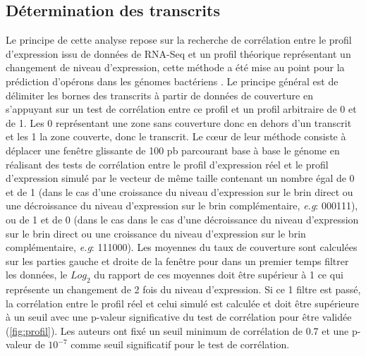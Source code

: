 \documentclass[12pt,a4paper]{report}
\begin{document}
\begin{onehalfspace}
\section*{Détermination des transcrits}
\label{methode_correlation}

Le principe de cette analyse repose sur la recherche de corrélation entre le profil d'expression issu de données de RNA-Seq et un profil théorique représentant un changement de niveau d'expression, cette méthode a été mise au point pour la prédiction d'opérons dans les génomes bactériens \citep{Fortino2014}. Le principe général est de délimiter les bornes des transcrits à partir de données de couverture en s'appuyant sur un test de corrélation entre ce profil et un profil arbitraire de 0 et de 1. Les 0 représentant une zone sans couverture donc en dehors d'un transcrit et les 1 la zone couverte, donc le transcrit. Le cœur de leur méthode consiste à déplacer une fenêtre glissante de 100 pb parcourant base à base le génome en réalisant des tests de corrélation entre le profil d'expression réel et le profil d'expression simulé par le vecteur de même taille contenant un nombre égal de 0 et de 1 (dans le cas d'une croissance du niveau d'expression sur le brin direct ou une décroissance du niveau d'expression sur le brin complémentaire, \textit{e.g}: 000111), ou de 1 et de 0 (dans le cas dans le cas d'une décroissance du niveau d'expression sur le brin direct ou une croissance du niveau d'expression sur le brin complémentaire, \textit{e.g}: 111000). Les moyennes du taux de couverture sont calculées sur les parties gauche et droite de la fenêtre pour dans un premier temps filtrer les données, le $Log_2$ du rapport de ces moyennes doit être supérieur à 1 ce qui représente un changement de 2 fois du niveau d'expression. Si ce 1 filtre est passé, la corrélation entre le profil réel et celui simulé est calculée et doit être supérieure à un seuil avec une p-valeur significative du test de corrélation pour être validée (\autoref{fig:profil}). Les auteurs ont fixé un seuil minimum de corrélation de 0.7 et une p-valeur de $10^{-7}$ comme seuil significatif pour le test de corrélation.

\begin{figure}
\end{figure}


\end{onehalfspace}
\end{document}

